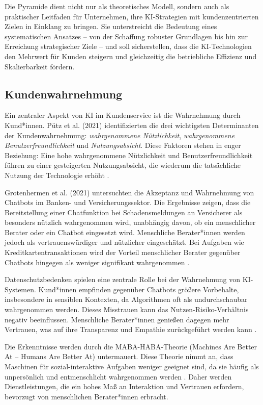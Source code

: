 \documentclass[12pt]{article}
\begin{document}
Die Pyramide dient nicht nur als theoretisches Modell, sondern auch als praktischer Leitfaden für Unternehmen, ihre KI-Strategien mit kundenzentrierten Zielen in Einklang zu bringen. Sie unterstreicht die Bedeutung eines systematischen Ansatzes – von der Schaffung robuster Grundlagen bis hin zur Erreichung strategischer Ziele – und soll sicherstellen, dass die KI-Technologien den Mehrwert für Kunden steigern und gleichzeitig die betriebliche Effizienz und Skalierbarkeit fördern.

\subsection{Kundenwahrnehmung}

Ein zentraler Aspekt von KI im Kundenservice ist die Wahrnehmung durch Kund*innen. Pütz et al. (2021) identifizierten die drei wichtigsten Determinanten der Kundenwahrnehmung: \textit{wahrgenommene Nützlichkeit}, \textit{wahrgenommene Benutzerfreundlichkeit} und \textit{Nutzungsabsicht}. Diese Faktoren stehen in enger Beziehung: Eine hohe wahrgenommene Nützlichkeit und Benutzerfreundlichkeit führen zu einer gesteigerten Nutzungsabsicht, die wiederum die tatsächliche Nutzung der Technologie erhöht \cite{putz_akzeptanz_2021}.

Grotenhermen et al. (2021) untersuchten die Akzeptanz und Wahrnehmung von Chatbots im Banken- und Versicherungssektor. Die Ergebnisse zeigen, dass die Bereitstellung einer Chatfunktion bei Schadensmeldungen an Versicherer als besonders nützlich wahrgenommen wird, unabhängig davon, ob ein menschlicher Berater oder ein Chatbot eingesetzt wird. Menschliche Berater*innen werden jedoch als vertrauenswürdiger und nützlicher eingeschätzt. Bei Aufgaben wie Kreditkartentransaktionen wird der Vorteil menschlicher Berater gegenüber Chatbots hingegen als weniger signifikant wahrgenommen  \cite{grotenhermen_wahrnehmungen_2021}.

Datenschutzbedenken spielen eine zentrale Rolle bei der Wahrnehmung von KI-Systemen. Kund*innen empfinden gegenüber Chatbots größere Vorbehalte, insbesondere in sensiblen Kontexten, da Algorithmen oft als undurchschaubar wahrgenommen werden. Dieses Misstrauen kann das Nutzen-Risiko-Verhältnis negativ beeinflussen. Menschliche Berater*innen genießen dagegen mehr Vertrauen, was auf ihre Transparenz und Empathie zurückgeführt werden kann \cite{kelly_what_2023, song_will_2022}.

Die Erkenntnisse werden durch die MABA-HABA-Theorie (Machines Are Better At – Humans Are Better At) untermauert. Diese Theorie nimmt an, dass Maschinen für sozial-interaktive Aufgaben weniger geeignet sind, da sie häufig als unpersönlich und entmenschlicht wahrgenommen werden \cite{grotenhermen_wahrnehmungen_2021}. Daher werden Dienstleistungen, die ein hohes Maß an Interaktion und Vertrauen erfordern, bevorzugt von menschlichen Berater*innen erbracht.
\end{document}
